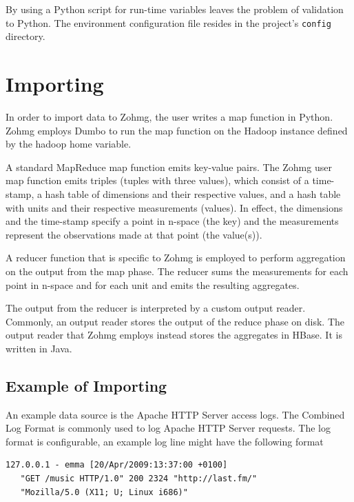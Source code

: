 By using a Python script for run-time variables leaves the problem of validation
to Python. The environment configuration file resides in the project's
\texttt{config} directory.


\section{Importing}

In order to import data to Zohmg, the user writes a map function in Python.
Zohmg employs Dumbo to run the map function on the Hadoop instance defined by
the hadoop home variable.

A standard MapReduce map function emits key-value pairs. The Zohmg user map
function emits triples (tuples with three values), which consist of a
time-stamp, a hash table of dimensions and their respective values, and a hash
table with units and their respective measurements (values). In effect, the
dimensions and the time-stamp specify a point in n-space (the key) and the
measurements represent the observations made at that point (the value(s)).

A reducer function that is specific to Zohmg is employed to perform aggregation
on the output from the map phase. The reducer sums the measurements for each
point in n-space and for each unit and emits the resulting aggregates.

The output from the reducer is interpreted by a custom output reader. Commonly,
an output reader stores the output of the reduce phase on disk. The output
reader that Zohmg employs instead stores the aggregates in HBase. It is written
in Java.

\subsection*{Example of Importing}


An example data source is the Apache HTTP Server access logs. The Combined Log
Format is commonly used to log Apache HTTP Server requests. The log format is
configurable, an example log line might have the following format

\vspace{12pt}

\begin{lstlisting}[caption=Example log line entry for the Apache HTTP Server's
Combined Log Format.,captionpos=b]
   127.0.0.1 - emma [20/Apr/2009:13:37:00 +0100]
   "GET /music HTTP/1.0" 200 2324 "http://last.fm/"
   "Mozilla/5.0 (X11; U; Linux i686)"
\end{lstlisting}

